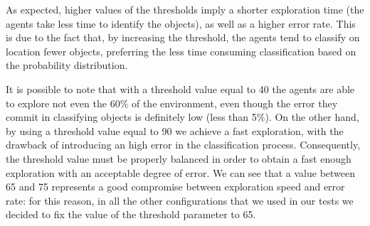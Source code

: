 \documentclass[a4paper, 10pt, conference]{ieeeconf}      %
\begin{document}
As expected, higher values of the thresholds imply a shorter exploration time (the agents take less time to identify the objects), as well as a higher error rate. This is due to the fact that, by increasing the threshold, the agents tend to classify on location fewer objects, preferring the less time consuming classification based on the probability distribution. 

It is possible to note that with a threshold value equal to 40 the agents are able to explore not even the 60\% of the environment, even though the error they commit in classifying objects is definitely low (less than 5\%). On the other hand, by using a threshold value equal to 90 we achieve a fast exploration, with the drawback of introducing an high error in the classification process. Consequently, the threshold value must be properly balanced in order to obtain a fast enough exploration with an acceptable degree of error. We can see that a value between 65 and 75 represents a good compromise between exploration speed and error rate: for this reason, in all the other configurations that we used in our tests we decided to fix the value of the threshold parameter to 65. 
\end{document}
